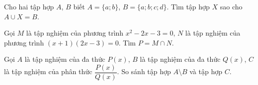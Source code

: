 \begin{bt}%
	Cho hai tập hợp $A$, $B$ biết $A=\{a;b\}$, $B=\{a;b;c;d\}$. Tìm tập hợp $X$ sao cho $A\cup X=B$.
\end{bt}

\begin{bt}%
	Gọi $M$ là tập nghiệm của phương trình $x^{2}-2 x-3=0$,
	$N$ là tập nghiệm của phương trình $(x+1)(2 x-3)=0$.
	Tìm	$P=M \cap N$.
\end{bt}

\begin{bt}%
	Gọi $A$ là tập nghiệm của đa thức $P(x)$, $B$ là tập nghiệm của đa thức $Q(x)$, $C$ là tập nghiệm của phân thức $\dfrac{P(x)}{Q(x)}$. So sánh tập hợp $A \setminus B$ và tập hợp $C$.
\end{bt}

